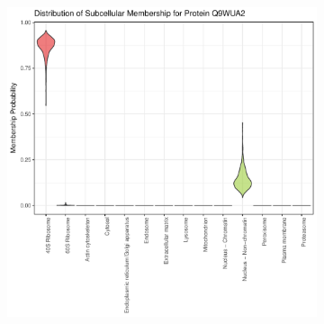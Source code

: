 \documentclass[12pt,english]{article}\usepackage[]{graphicx}\usepackage[]{color}
\makeatletter
\def\maxwidth{ %
  \ifdim\Gin@nat@width>\linewidth
    \linewidth
  \else
    \Gin@nat@width
  \fi
}
\newenvironment{knitrout}{}{} %
\makeatother
\begin{document}
\begin{figure}[h]
  \centering
  \begin{subfigure}[t]{0.5\textwidth}
    \centering
\begin{knitrout}
\color{fgcolor}

{\centering \includegraphics[width=\maxwidth]{figure/unnamed-chunk-16-1} 

}



\end{knitrout}
    \caption{}
  \end{subfigure}%
  \begin{subfigure}[t]{0.5\textwidth}
    \centering
\begin{knitrout}
\color{fgcolor}


\end{knitrout}
\end{subfigure}
\end{figure}
\end{document}
